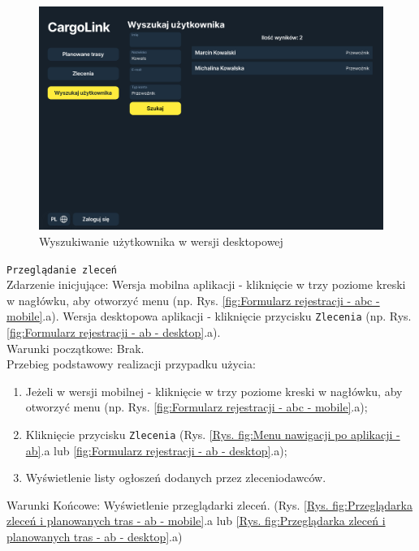 \begin{figure}[H]
	\centering
		\includegraphics[width=0.45\linewidth]{rozdzial1/szukaj_uzytkownika_d.jpg}
	\caption{Wyszukiwanie użytkownika w wersji desktopowej}
	\label{Rys. fig:Wyszukiwanie użytkownika - destkop}
\end{figure}

\label{Przeglądanie zleceń}
\texttt{Przeglądanie zleceń} \\
Zdarzenie inicjujące: Wersja mobilna aplikacji - kliknięcie w trzy poziome kreski w nagłówku, aby otworzyć menu (np. Rys. \ref{fig:Formularz rejestracji - abc - mobile}.a). Wersja desktopowa aplikacji - kliknięcie przycisku \texttt{Zlecenia} (np. Rys. \ref{fig:Formularz rejestracji - ab - desktop}.a). \\
Warunki początkowe: Brak. \\
Przebieg podstawowy realizacji przypadku użycia:
\begin{enumerate}
    \item Jeżeli w wersji mobilnej - kliknięcie w trzy poziome kreski w nagłówku, aby otworzyć menu (np. Rys. \ref{fig:Formularz rejestracji - abc - mobile}.a);
    \item Kliknięcie przycisku \texttt{Zlecenia} (Rys. \ref{Rys. fig:Menu nawigacji po aplikacji - ab}.a lub \ref{fig:Formularz rejestracji - ab - desktop}.a);
    \item Wyświetlenie listy ogłoszeń dodanych przez zleceniodawców.
\end{enumerate}
Warunki Końcowe: Wyświetlenie przeglądarki zleceń. (Rys. \ref{Rys. fig:Przeglądarka zleceń i planowanych tras - ab - mobile}.a lub \ref{Rys. fig:Przeglądarka zleceń i planowanych tras - ab - desktop}.a)
